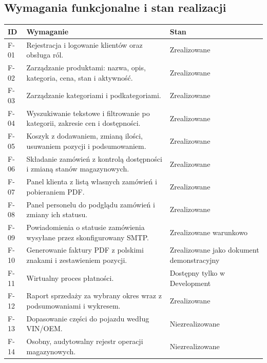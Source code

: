 \documentclass[12pt,a4paper]{article}
\begin{document}
\subsection{Wymagania funkcjonalne i stan realizacji}
\begin{longtable}{@{}p{}p{}p{}@{}}
\toprule
\textbf{ID} & \textbf{Wymaganie} & \textbf{Stan}\\
\midrule
\endhead
F-01 & Rejestracja i logowanie klientów oraz obsługa ról. & Zrealizowane\\
F-02 & Zarządzanie produktami: nazwa, opis, kategoria, cena, stan i aktywność. & Zrealizowane\\
F-03 & Zarządzanie kategoriami i podkategoriami. & Zrealizowane\\
F-04 & Wyszukiwanie tekstowe i filtrowanie po kategorii, zakresie cen i dostępności. & Zrealizowane\\
F-05 & Koszyk z dodawaniem, zmianą ilości, usuwaniem pozycji i podsumowaniem. & Zrealizowane\\
F-06 & Składanie zamówień z kontrolą dostępności i zmianą stanów magazynowych. & Zrealizowane\\
F-07 & Panel klienta z listą własnych zamówień i pobieraniem PDF. & Zrealizowane\\
F-08 & Panel personelu do podglądu zamówień i zmiany ich statusu. & Zrealizowane\\
F-09 & Powiadomienia o statusie zamówienia wysyłane przez skonfigurowany SMTP. & Zrealizowane warunkowo\\
F-10 & Generowanie faktury PDF z polskimi znakami i zestawieniem pozycji. & Zrealizowane jako dokument demonstracyjny\\
F-11 & Wirtualny proces płatności. & Dostępny tylko w Development\\
F-12 & Raport sprzedaży za wybrany okres wraz z podsumowaniami i wykresem. & Zrealizowane\\
F-13 & Dopasowanie części do pojazdu według VIN/OEM. & Niezrealizowane\\
F-14 & Osobny, audytowalny rejestr operacji magazynowych. & Niezrealizowane\\
\bottomrule
\end{longtable}
\end{document}
